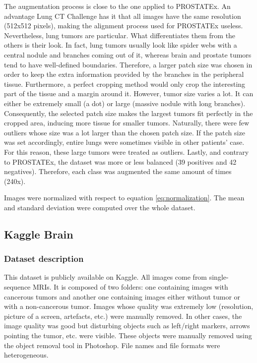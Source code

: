 The augmentation process is close to the one applied to PROSTATEx. An advantage Lung CT Challenge has it that all images have the same resolution (512x512 pixels), making the alignment process used for PROSTATEx useless. Nevertheless, lung tumors are particular. What differentiates them from the others is their look. In fact, lung tumors usually look like spider webs with a central nodule and branches coming out of it, whereas brain and prostate tumors tend to have well-defined boundaries. Therefore, a larger patch size was chosen in order to keep the extra information provided by the branches in the peripheral tissue. Furthermore, a perfect cropping method would only crop the interesting part of the tissue and a margin around it. However, tumor size varies a lot. It can either be extremely small (a dot) or large (massive nodule with long branches). Consequently, the selected patch size makes the largest tumors fit perfectly in the cropped area, inducing more tissue for smaller tumors. Naturally, there were few outliers whose size was a lot larger than the chosen patch size. If the patch size was set accordingly, entire lungs were sometimes visible in other patients' case. For this reason, these large tumors were treated as outliers. Lastly, and contrary to PROSTATEx, the dataset was more or less balanced (39 positives and 42 negatives). Therefore, each class was augmented the same amount of times (240x). 

Images were normalized with respect to equation \ref{eq:normalization}. The mean and standard deviation were computed over the whole dataset. 


\subsection{Kaggle Brain}
\subsubsection{Dataset description}
This dataset is publicly available on Kaggle. All images come from single-sequence MRIs. It is composed of two folders: one containing images with cancerous tumors and another one containing images either without tumor or with a non-cancerous tumor. Images whose quality was extremely low (resolution, picture of a screen, artefacts, etc.) were manually removed. In other cases, the image quality was good but disturbing objects such as left/right markers, arrows pointing the tumor, etc. were visible. These objects were manually removed using the object removal tool in Photoshop. File names and file formats were heterogeneous.


